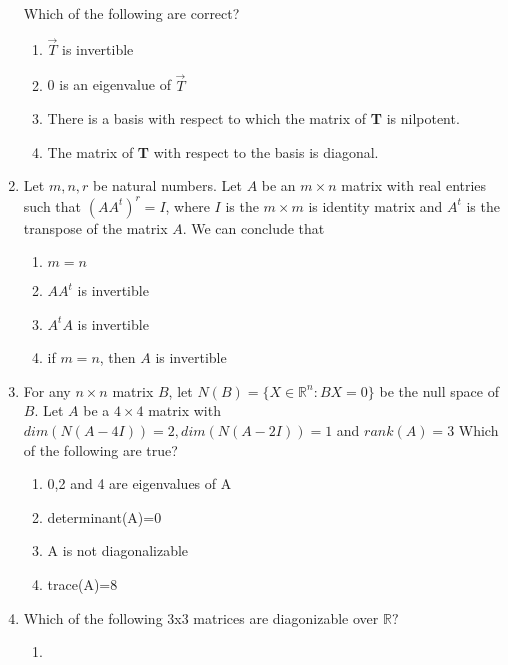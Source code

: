 \begin{enumerate}[label=\thesection.\arabic*.,ref=\thesection.\theenumi]
Which of the following are correct?\\
\begin{enumerate}
\item $\vec{T}$ is invertible
\item 0 is an eigenvalue of $\vec{T}$
\item There is a basis with respect to which the matrix of \textbf{T} is nilpotent.
\item The matrix of \textbf{T} with respect to the basis  is diagonal.
\end{enumerate}
\solution

\item Let $m,n,r$ be natural numbers. Let $A$ be an $m\times n$ matrix with real entries such that $(AA^t)^r = I$, where $I$ is the $m \times m$ is identity matrix and $A^t$ is the transpose of the matrix $A$. We can conclude that\\
\begin{enumerate}
\item
$m = n$\\
\item
$AA^t$ is invertible\\
\item
$A^tA$ is invertible\\
\item
if $m=n$, then $A$ is invertible
\end{enumerate}
%
\solution

\item For any $n\times n$ matrix $B$, let $N(B)=\{X\in \mathbb{R}^n:BX=0\}$ be the null space of $B$. Let $A$ be a $4\times 4$ matrix with $dim(N(A-4I))=2, dim(N(A-2I))=1$ and $rank(A)=3$
Which of the following are true?
\begin{enumerate}
\item 0,2 and 4 are eigenvalues of A
\item determinant(A)=0
\item A is not diagonalizable
\item trace(A)=8
\end{enumerate}
%
\solution

\item Which of the following 3x3 matrices are diagonizable over $\mathbb{R}?$\\
\begin{enumerate}
    \item {}

\end{enumerate}
\end{enumerate}

